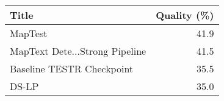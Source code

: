 \begin{tabular}{lr}
\toprule
Title & Quality (\%) \\
\midrule
MapTest & 41.9 \\
MapText Dete...Strong Pipeline & 41.5 \\
Baseline TESTR Checkpoint & 35.5 \\
DS-LP & 35.0 \\
\bottomrule
\end{tabular}
